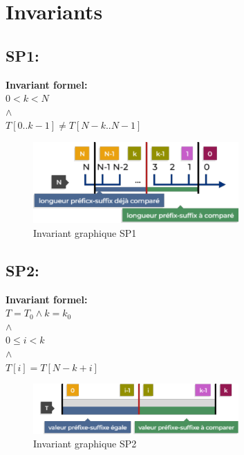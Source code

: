 \section{Invariants}\label{invariants}

\subsection{SP1:}
\textbf{Invariant formel:} \\
    $0 < k < N$ \\
    $\land$ \\
    $T[0..k-1] \neq T[N-k..N-1]$ \\

\begin{figure}[h]
    \centering
    \includegraphics[width=0.7\textwidth]{invariant_1.pdf}
    \caption{Invariant graphique SP1}
\end{figure}

\subsection{SP2:}
\textbf{Invariant formel:} \\
    $T = T_0 \land k = k_0$ \\
    $\land$ \\
    $0 \leq i < k$ \\
    $\land$ \\
    $T[i] = T[N - k + i]$ \\

\begin{figure}[h]
    \centering
    \includegraphics[width=0.7\textwidth]{invariant_2.pdf}
    \caption{Invariant graphique SP2}
\end{figure}

